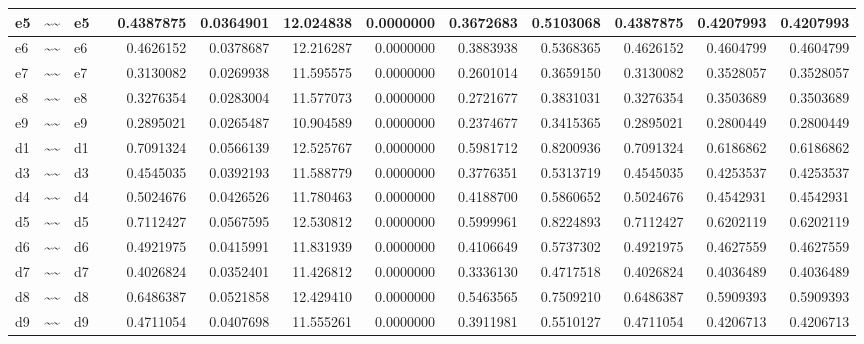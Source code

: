 \documentclass[
  super,
  preprint,
  3p]{elsarticle}
\begin{document}
\begin{tabular}{l|l|l|l|r|r|r|r|r|r|r|r|r}
\hline
e5 & \textasciitilde{}\textasciitilde{} & e5 &  & 0.4387875 & 0.0364901 & 12.024838 & 0.0000000 & 0.3672683 & 0.5103068 & 0.4387875 & 0.4207993 & 0.4207993\\
\hline
e6 & \textasciitilde{}\textasciitilde{} & e6 &  & 0.4626152 & 0.0378687 & 12.216287 & 0.0000000 & 0.3883938 & 0.5368365 & 0.4626152 & 0.4604799 & 0.4604799\\
\hline
e7 & \textasciitilde{}\textasciitilde{} & e7 &  & 0.3130082 & 0.0269938 & 11.595575 & 0.0000000 & 0.2601014 & 0.3659150 & 0.3130082 & 0.3528057 & 0.3528057\\
\hline
e8 & \textasciitilde{}\textasciitilde{} & e8 &  & 0.3276354 & 0.0283004 & 11.577073 & 0.0000000 & 0.2721677 & 0.3831031 & 0.3276354 & 0.3503689 & 0.3503689\\
\hline
e9 & \textasciitilde{}\textasciitilde{} & e9 &  & 0.2895021 & 0.0265487 & 10.904589 & 0.0000000 & 0.2374677 & 0.3415365 & 0.2895021 & 0.2800449 & 0.2800449\\
\hline
d1 & \textasciitilde{}\textasciitilde{} & d1 &  & 0.7091324 & 0.0566139 & 12.525767 & 0.0000000 & 0.5981712 & 0.8200936 & 0.7091324 & 0.6186862 & 0.6186862\\
\hline
d3 & \textasciitilde{}\textasciitilde{} & d3 &  & 0.4545035 & 0.0392193 & 11.588779 & 0.0000000 & 0.3776351 & 0.5313719 & 0.4545035 & 0.4253537 & 0.4253537\\
\hline
d4 & \textasciitilde{}\textasciitilde{} & d4 &  & 0.5024676 & 0.0426526 & 11.780463 & 0.0000000 & 0.4188700 & 0.5860652 & 0.5024676 & 0.4542931 & 0.4542931\\
\hline
d5 & \textasciitilde{}\textasciitilde{} & d5 &  & 0.7112427 & 0.0567595 & 12.530812 & 0.0000000 & 0.5999961 & 0.8224893 & 0.7112427 & 0.6202119 & 0.6202119\\
\hline
d6 & \textasciitilde{}\textasciitilde{} & d6 &  & 0.4921975 & 0.0415991 & 11.831939 & 0.0000000 & 0.4106649 & 0.5737302 & 0.4921975 & 0.4627559 & 0.4627559\\
\hline
d7 & \textasciitilde{}\textasciitilde{} & d7 &  & 0.4026824 & 0.0352401 & 11.426812 & 0.0000000 & 0.3336130 & 0.4717518 & 0.4026824 & 0.4036489 & 0.4036489\\
\hline
d8 & \textasciitilde{}\textasciitilde{} & d8 &  & 0.6486387 & 0.0521858 & 12.429410 & 0.0000000 & 0.5463565 & 0.7509210 & 0.6486387 & 0.5909393 & 0.5909393\\
\hline
d9 & \textasciitilde{}\textasciitilde{} & d9 &  & 0.4711054 & 0.0407698 & 11.555261 & 0.0000000 & 0.3911981 & 0.5510127 & 0.4711054 & 0.4206713 & 0.4206713\\

\end{tabular}
\end{document}
